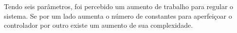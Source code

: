 Tendo seis parâmetros, foi percebido um aumento de trabalho para regular o sistema. Se por um lado aumenta o número
de constantes para aperfeiçoar o controlador por outro existe um aumento de sua complexidade. 